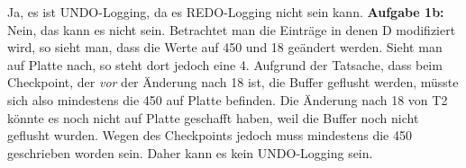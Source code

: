 \documentclass[12pt]{article}
\begin{document}
 Ja, es ist UNDO-Logging, da es REDO-Logging nicht sein kann.
\textbf{Aufgabe 1b: } Nein, das kann es nicht sein. Betrachtet man die Einträge in denen D modifiziert wird,
					  so sieht man, dass die Werte auf 450 und 18 geändert werden. Sieht man auf Platte nach, so steht dort jedoch 
					  eine 4. Aufgrund der Tatsache, dass beim Checkpoint, der \textit{vor} der Änderung nach 18 ist, die Buffer geflusht werden, müsste sich also mindestens die 450 auf Platte befinden. Die Änderung nach 18 von T2 könnte
					  es noch nicht auf Platte geschafft haben, weil die Buffer noch nicht geflusht wurden. Wegen des Checkpoints jedoch muss mindestens die 450 geschrieben worden sein. Daher kann es kein UNDO-Logging sein.
\end{document}
